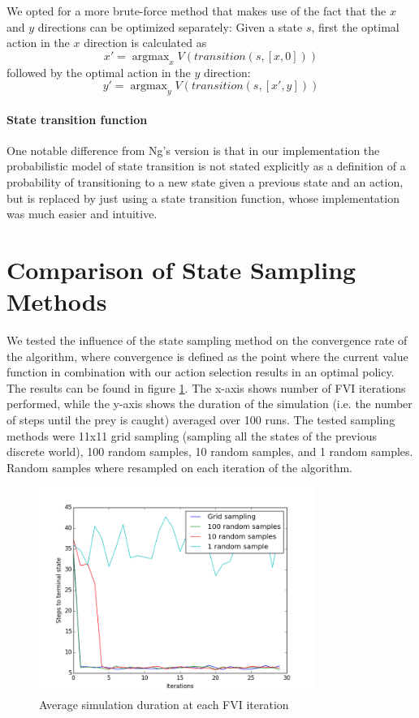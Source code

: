 \documentclass[a4paper, 12pt]{article}
\DeclareMathOperator*{\argmax}{argmax}
\begin{document}
We opted for a more brute-force method that makes use of the fact that
the $x$ and $y$ directions can be optimized separately: Given a state $s$, first
the optimal action in the $x$ direction is calculated as
\[
  x' = \argmax_x V(transition(s, [x, 0]))
\]
followed by the optimal action in the $y$ direction:
\[
  y' = \argmax_y V(transition(s, [x', y]))
\]

\paragraph{State transition function}
One notable difference from Ng's version is that in our implementation
the probabilistic model of state transition is not stated explicitly
as a definition of a probability of transitioning to a new state 
given a previous state and an action, but is replaced by
just using a state transition function, whose implementation
was much easier and intuitive.

\section*{Comparison of State Sampling Methods}
\FloatBarrier
We tested the influence of the state sampling method on the convergence rate of
the algorithm, where convergence is defined as the point where the current value
function in combination with our action selection results in an optimal policy.
The results can be found in figure \ref{fig:conv}. The x-axis shows number of
FVI iterations performed, while the y-axis shows the duration of the simulation
(i.e. the number of steps until the prey is caught) averaged over 100 runs. The
tested sampling methods were 11x11 grid sampling (sampling all the states of the
previous discrete world), 100 random samples, 10 random samples, and 1 random
samples. Random samples where resampled on each iteration of the algorithm.

\begin{figure}[htb]
  \centering
  \includegraphics[width=0.8\textwidth]{convergence.png}
  \caption{Average simulation duration at each FVI iteration}
  \label{fig:conv}
\end{figure}
\end{document}
